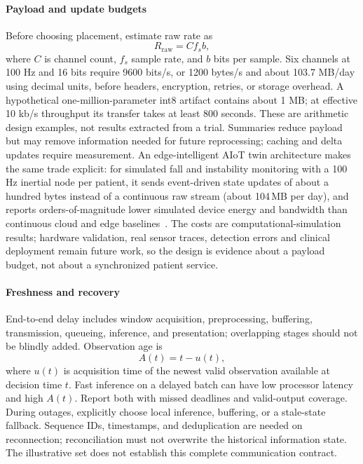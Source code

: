\documentclass[journal]{IEEEtran}
\begin{document}
\paragraph{Payload and update budgets} Before choosing placement, estimate raw rate as
\begin{equation}
R_{\mathrm{raw}}=C f_s b,
\label{eq:rawrate}
\end{equation}
where $C$ is channel count, $f_s$ sample rate, and $b$ bits per sample. Six channels at 100 Hz and 16 bits require 9600 bits/s, or 1200 bytes/s and about 103.7 MB/day using decimal units, before headers, encryption, retries, or storage overhead. A hypothetical one-million-parameter int8 artifact contains about 1 MB; at effective 10 kb/s throughput its transfer takes at least 800 seconds. These are arithmetic design examples, not results extracted from a trial. Summaries reduce payload but may remove information needed for future reprocessing; caching and delta updates require measurement. An edge-intelligent AIoT twin architecture makes the same trade explicit: for simulated fall and instability monitoring with a 100\,Hz inertial node per patient, it sends event-driven state updates of about a hundred bytes instead of a continuous raw stream (about 104\,MB per day), and reports orders-of-magnitude lower simulated device energy and bandwidth than continuous cloud and edge baselines~\cite{jun2026aiottwin}. The costs are computational-simulation results; hardware validation, real sensor traces, detection errors and clinical deployment remain future work, so the design is evidence about a payload budget, not about a synchronized patient service.

\paragraph{Freshness and recovery} End-to-end delay includes window acquisition, preprocessing, buffering, transmission, queueing, inference, and presentation; overlapping stages should not be blindly added. Observation age is
\begin{equation}
A(t)=t-u(t),
\label{eq:freshness}
\end{equation}
where $u(t)$ is acquisition time of the newest valid observation available at decision time $t$. Fast inference on a delayed batch can have low processor latency and high $A(t)$. Report both with missed deadlines and valid-output coverage. During outages, explicitly choose local inference, buffering, or a stale-state fallback. Sequence IDs, timestamps, and deduplication are needed on reconnection; reconciliation must not overwrite the historical information state. The illustrative set does not establish this complete communication contract.
\end{document}
